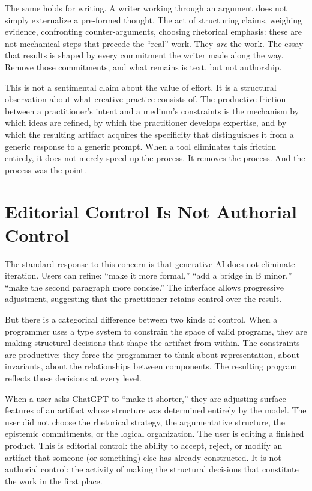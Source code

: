 \documentclass[11pt]{article}
\begin{document}
The same holds for writing. A writer working through an argument does not simply externalize a pre-formed thought. The act of structuring claims, weighing evidence, confronting counter-arguments, choosing rhetorical emphasis: these are not mechanical steps that precede the ``real'' work. They \emph{are} the work. The essay that results is shaped by every commitment the writer made along the way. Remove those commitments, and what remains is text, but not authorship.

This is not a sentimental claim about the value of effort. It is a structural observation about what creative practice consists of. The productive friction between a practitioner's intent and a medium's constraints is the mechanism by which ideas are refined, by which the practitioner develops expertise, and by which the resulting artifact acquires the specificity that distinguishes it from a generic response to a generic prompt. When a tool eliminates this friction entirely, it does not merely speed up the process. It removes the process. And the process was the point.

\section{Editorial Control Is Not Authorial Control}

The standard response to this concern is that generative AI does not eliminate iteration. Users can refine: ``make it more formal,'' ``add a bridge in B minor,'' ``make the second paragraph more concise.'' The interface allows progressive adjustment, suggesting that the practitioner retains control over the result.

But there is a categorical difference between two kinds of control. When a programmer uses a type system to constrain the space of valid programs, they are making structural decisions that shape the artifact from within. The constraints are productive: they force the programmer to think about representation, about invariants, about the relationships between components. The resulting program reflects those decisions at every level.

When a user asks ChatGPT to ``make it shorter,'' they are adjusting surface features of an artifact whose structure was determined entirely by the model. The user did not choose the rhetorical strategy, the argumentative structure, the epistemic commitments, or the logical organization. The user is editing a finished product. This is editorial control: the ability to accept, reject, or modify an artifact that someone (or something) else has already constructed. It is not authorial control: the activity of making the structural decisions that constitute the work in the first place.
\end{document}
